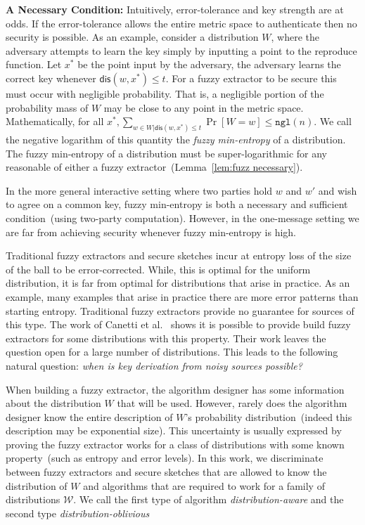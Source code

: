 \documentclass[11pt]{article}
\newcommand{\lemref}[1]{\mbox{Lemma~\ref{#1}}}
\newcommand{\dis}{\ensuremath{\mathsf{dis}}}
\newcommand{\ngl}{\ensuremath{\mathtt{ngl}}\xspace}
\begin{document}
\textbf{A Necessary Condition:}  Intuitively, error-tolerance and key strength are at odds.  If the error-tolerance allows the entire metric space to authenticate then no security is possible.  As an example, consider a distribution $W$, where the adversary attempts to learn the key simply by inputting a point to the reproduce function.  Let $x^*$ be the point input by the adversary, the adversary learns the correct key whenever $\dis(w, x^*)\le t$.  For a fuzzy extractor to be secure this must occur with negligible probability.  That is, a negligible portion of the probability mass of $W$ may be close to any point in the metric space.  Mathematically, for all $x^*, \sum_{w\in W | \dis(w, x^*)\le t} \Pr[ W= w] \le \ngl(n)$.  We call the negative logarithm of this quantity the \emph{fuzzy min-entropy} of a distribution.  The fuzzy min-entropy of a distribution must be super-logarithmic for any reasonable of either a fuzzy extractor~(\lemref{lem:fuzz necessary}).  

In the more general interactive setting where two parties hold $w$ and $w'$ and wish to agree on a common key, fuzzy min-entropy is both a necessary and sufficient condition~(using two-party computation). 
However, in the one-message setting we are far from achieving security whenever fuzzy min-entropy is high.


Traditional fuzzy extractors and secure sketches incur at entropy loss of the size of the ball to be error-corrected.  While, this is optimal for the uniform distribution, it is far from optimal for distributions that arise in practice.  As an example, many examples that arise in practice there are more error patterns than starting entropy.  Traditional fuzzy extractors provide no guarantee for sources of this type.  The work of Canetti et al.~\cite{canetti2014key} shows it is possible to provide build fuzzy extractors for some distributions with this property.  Their work leaves the question open for a large number of distributions.  This leads to the following natural question: \emph{when is key derivation from noisy sources possible?}

When building a fuzzy extractor, the algorithm designer has some information about the distribution $W$ that will be used.  However, rarely does the algorithm designer know the entire description of $W$'s probability distribution~(indeed this description may be exponential size).  This uncertainty is usually expressed by proving the fuzzy extractor works for a class of distributions with some known property~(such as entropy and error levels).  In this work, we discriminate between fuzzy extractors and secure sketches that are allowed to know the distribution of $W$ and algorithms that are required to work for a family of distributions $\mathcal{W}$.  We call the first type of algorithm \emph{distribution-aware} and the second type \emph{distribution-oblivious}
\end{document}
